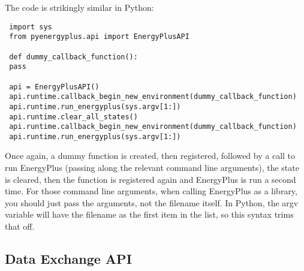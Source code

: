 The code is strikingly similar in Python:

\begin{lstlisting}
 import sys
 from pyenergyplus.api import EnergyPlusAPI

 def dummy_callback_function():
 pass

 api = EnergyPlusAPI()
 api.runtime.callback_begin_new_environment(dummy_callback_function)
 api.runtime.run_energyplus(sys.argv[1:])
 api.runtime.clear_all_states()
 api.runtime.callback_begin_new_environment(dummy_callback_function)
 api.runtime.run_energyplus(sys.argv[1:])
\end{lstlisting}

Once again, a dummy function is created, then registered, followed by a call to run EnergyPlus (passing along the relevant command line arguments), the state is cleared, then the function is registered again and EnergyPlus is run a second time.  For those command line arguments, when calling EnergyPlus as a library, you should just pass the arguments, not the filename itself.  In Python, the argv variable will have the filename as the first item in the list, so this syntax trims that off.

\subsection{Data Exchange API}\label{subsec:data-exchange-api}

